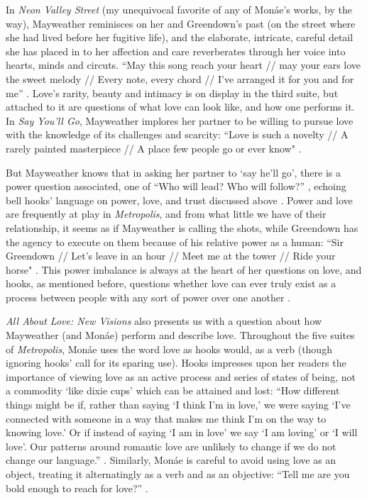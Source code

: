 \documentclass[a4paper, 11pt]{article} %
\begin{document}
In \emph{Neon Valley Street} (my unequivocal favorite of any of Mon\'ae's works, by the way), Mayweather reminisces on her and Greendown's past (on the street where she had lived before her fugitive life), and the elaborate, intricate, careful detail she has placed in to her affection and care reverberates through her voice into hearts, minds and circuts.
``May this song reach your heart // may your ears love the sweet melody // Every note, every chord // I've arranged it for you and for me'' \cite{neonvalleystreet}.
Love's rarity, beauty and intimacy is on display in the third suite, but attached to it are questions of what love can look like, and how one performs it.
In \emph{Say You'll Go}, Mayweather implores her partner to be willing to pursue love with the knowledge of its challenges and scarcity:
``Love is such a novelty // A rarely painted masterpiece // A place few people go or ever know" \cite{sayyouwillgo}.

But Mayweather knows that in asking her partner to `say he'll go', there is a power question associated, one of ``Who will lead? Who will follow?''
 \cite{sayyouwillgo}, echoing bell hooks' language on power, love, and trust discussed above \cite{newvisions}.
Power and love are frequently at play in \emph{Metropolis}, and from what little we have of their relationship, it seems as if Mayweather is calling the shots, while Greendown has the agency to execute on them because of his relative power as a human: ``Sir Greendown // Let's leave in an hour // Meet me at the tower // Ride your horse" \cite{greendown}.
This power imbalance is always at the heart of her questions on love, and hooks, as mentioned before, questions whether love can ever truly exist as a process between people with any sort of power over one another \cite{newvisions}.

\emph{All About Love: New Visions} also presents us with a question about how Mayweather (and Mon\'ae) perform and describe love.
Throughout the five suites of \emph{Metropolis}, Mon\'ae uses the word love as hooks would, as a verb (though ignoring hooks' call for its sparing use).
Hooks impresses upon her readers the importance of viewing love as an active process and series of states of being, not a commodity `like dixie cups' which can be attained and lost:
``How different things might be if, rather than saying `I think I'm in love,' we were saying `I've connected with someone in a way that makes me think I'm on the way to knowing love.' Or if instead of saying `I am in love' we say `I am loving' or `I will love'. Our patterns around romantic love are unlikely to change if we do not change our language.'' \cite{newvisions}.
Similarly, Mon\'ae is careful to avoid using love as an object, treating it alternatingly as a verb and as an objective: ``Tell me are you bold enough to reach for love?'' \cite{manymoons}.
\end{document}
